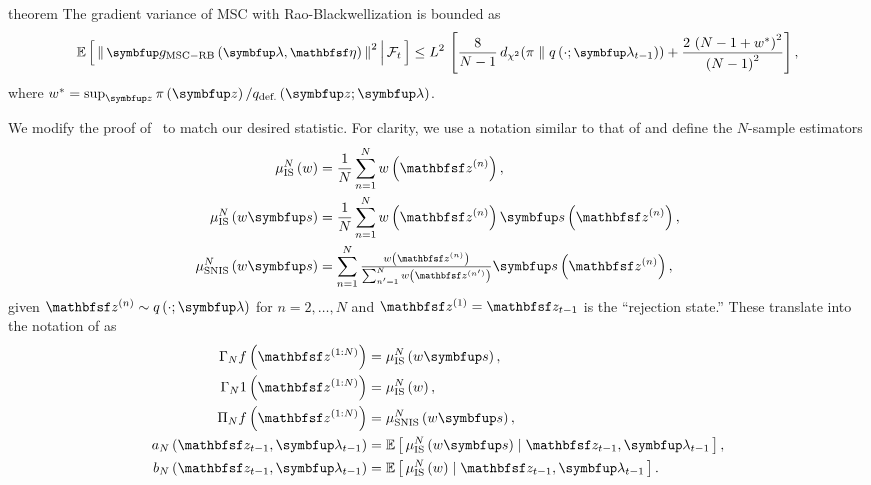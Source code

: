 \begin{theoremEnd}{theorem}\label{thm:mscrb}
  The gradient variance of MSC with Rao-Blackwellization is bounded as
  \begin{align*}
  {\small
    \E{ \norm{ \vg_{\mathrm{MSC-RB}}\left(\vlambda, \rvveta\right) }^2 \,\middle|\, \mathcal{F}_{t} } \leq
    L^2 \, \left[
    \frac{8}{N-1}\,\DChi{\pi}{q\left(\cdot; \vlambda_{t-1}\right)}
    +
    \frac{{2\,\left(N - 1 + w^*\right)}^2}{{\left(N - 1\right)}^2}
    \right],
  }
  \end{align*}
  where \(w^* = \sup_{\vz} \pi\left(\vz\right) / q_{\text{def.}}\left(\vz;\vlambda\right)\).
\end{theoremEnd}
\begin{proofEnd}

  We modify the proof of~\citet[Theorem 3]{cardoso_brsnis_2022} to match our desired statistic.
  For clarity, we use a notation similar to that of \citet{10.1214/17-STS611} and define the \(N\)-sample estimators
  \begin{align*}
    \mu^{N}_{\text{IS}}\left(w\right)
    &= 
    \frac{1}{N} \sum^{N}_{n=1} w\left(\rvvz^{(n)}\right),
    \\
    \mu^{N}_{\text{IS}}\left(w\vs\right)
    &= 
    \frac{1}{N} \sum^{N}_{n=1} w\left(\rvvz^{(n)}\right) \vs\left(\rvvz^{(n)}\right),
    \\
    \mu^{N}_{\text{SNIS}}\left(w\vs\right)
    &= 
    \sum^{N}_{n=1} {\textstyle\frac{w\left(\rvvz^{(n)}\right)}{ \sum^{N}_{n^{\prime}=1} w\left(\rvvz^{(n^{\prime})}\right) }} \vs\left(\rvvz^{(n)}\right),
  \end{align*}
  given \(\rvvz^{(n)} \sim q\left(\cdot; \vlambda\right)\) for \(n=2, \ldots, N\) and \(\rvvz^{(1)} = \rvvz_{t-1}\) is the ``rejection state.''
  These translate into the notation of \citet{cardoso_brsnis_2022} as
  \begin{align*}
    {\Gamma_N}f\left(\rvvz^{(1:N)}\right) &= 
    \mu^{N}_{\text{IS}}\left(w\vs\right),
    \\
    {\Gamma_N}1\left(\rvvz^{(1:N)}\right) &=
    \mu^{N}_{\text{IS}}\left(w\right),
    \\
    {\Pi_N}f\left(\rvvz^{(1:N)}\right) &=
    \mu^{N}_{\text{SNIS}}\left(w\vs\right),
    \\
    a_N\left(\rvvz_{t-1}, \vlambda_{t-1}\right) 
    &= 
    \E{ \mu^{N}_{\text{IS}}\left(w\vs\right) \mid \rvvz_{t-1}, \vlambda_{t-1} },
    \\
    b_N\left(\rvvz_{t-1}, \vlambda_{t-1}\right)
    &= 
    \E{ \mu^{N}_{\text{IS}}\left(w\right) \mid \rvvz_{t-1}, \vlambda_{t-1} }.
  \end{align*}


\end{proofEnd}
